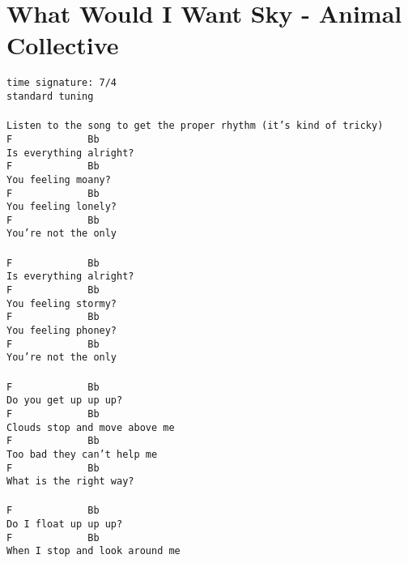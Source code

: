 \newpage
\section{What Would I Want Sky - Animal Collective}
\label{What Would I Want Sky - Animal Collective}
\texttt{time\ signature:\ 7/4\\
standard\ tuning\\
\\
Listen\ to\ the\ song\ to\ get\ the\ proper\ rhythm\ (it's\ kind\ of\ tricky)\\
F\ \ \ \ \ \ \ \ \ \ \ \ \ Bb\\
Is\ everything\ alright?\\
F\ \ \ \ \ \ \ \ \ \ \ \ \ Bb\\
You\ feeling\ moany?\\
F\ \ \ \ \ \ \ \ \ \ \ \ \ Bb\\
You\ feeling\ lonely?\\
F\ \ \ \ \ \ \ \ \ \ \ \ \ Bb\\
You're\ not\ the\ only\\
\\
F\ \ \ \ \ \ \ \ \ \ \ \ \ Bb\\
Is\ everything\ alright?\\
F\ \ \ \ \ \ \ \ \ \ \ \ \ Bb\\
You\ feeling\ stormy?\\
F\ \ \ \ \ \ \ \ \ \ \ \ \ Bb\\
You\ feeling\ phoney?\\
F\ \ \ \ \ \ \ \ \ \ \ \ \ Bb\\
You're\ not\ the\ only\\
\\
F\ \ \ \ \ \ \ \ \ \ \ \ \ Bb\\
Do\ you\ get\ up\ up\ up?\\
F\ \ \ \ \ \ \ \ \ \ \ \ \ Bb\\
Clouds\ stop\ and\ move\ above\ me\\
F\ \ \ \ \ \ \ \ \ \ \ \ \ Bb\\
Too\ bad\ they\ can't\ help\ me\\
F\ \ \ \ \ \ \ \ \ \ \ \ \ Bb\\
What\ is\ the\ right\ way?\\
\\
F\ \ \ \ \ \ \ \ \ \ \ \ \ Bb\\
Do\ I\ float\ up\ up\ up?\\
F\ \ \ \ \ \ \ \ \ \ \ \ \ Bb\\
When\ I\ stop\ and\ look\ around\ me\\
}
